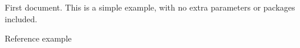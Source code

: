 \documentclass{article}
\begin{document}
First document. This is a simple example, with no 
extra parameters or packages included.


Reference example \cite{knuth1984}



\end{document}
